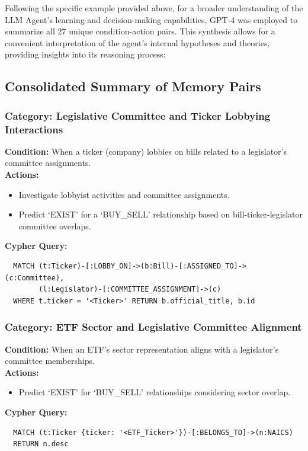 \documentclass[15pt,letterpaper]{article}
\begin{document}
Following the specific example provided above, for a broader understanding of the LLM Agent's learning and decision-making capabilities, GPT-4 was employed to summarize all 27 unique condition-action pairs. This synthesis allows for a convenient interpretation of the agent's internal hypotheses and theories, providing insights into its reasoning process:

\vspace{5mm} %

\begin{mdframed}
  \subsection*{Consolidated Summary of Memory Pairs}
  
  \subsubsection*{Category: Legislative Committee and Ticker Lobbying Interactions}
  \textbf{Condition:} When a ticker (company) lobbies on bills related to a legislator's committee assignments.\\
  \textbf{Actions:} 
  \begin{itemize}
      \item Investigate lobbyist activities and committee assignments.
      \item Predict `EXIST' for a `BUY\_SELL' relationship based on bill-ticker-legislator committee overlaps.
  \end{itemize}
  \textbf{Cypher Query:} 
  \begin{verbatim}
  MATCH (t:Ticker)-[:LOBBY_ON]->(b:Bill)-[:ASSIGNED_TO]->(c:Committee),
        (l:Legislator)-[:COMMITTEE_ASSIGNMENT]->(c)
  WHERE t.ticker = '<Ticker>' RETURN b.official_title, b.id
  \end{verbatim}
  
  \subsubsection*{Category: ETF Sector and Legislative Committee Alignment}
  \textbf{Condition:} When an ETF's sector representation aligns with a legislator's committee memberships.
  \\ \textbf{Actions:}
  \begin{itemize}
      \item Predict `EXIST' for `BUY\_SELL' relationships considering sector overlap.
  \end{itemize}
  \textbf{Cypher Query:} 
  \begin{verbatim}
  MATCH (t:Ticker {ticker: '<ETF_Ticker>'})-[:BELONGS_TO]->(n:NAICS)
  RETURN n.desc
  \end{verbatim}
  

\end{mdframed}
\end{document}
